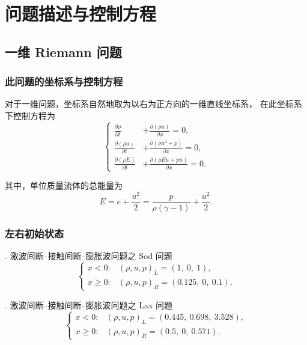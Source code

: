 \section{问题描述与控制方程}

\subsection{一维 Riemann 问题}

\subsubsection{此问题的坐标系与控制方程}
    对于一维问题，坐标系自然地取为以右为正方向的一维直线坐标系，
    在此坐标系下控制方程为
\begin{equation}
\left\{
\begin{aligned}
\frac{\partial \rho}{\partial t}
&+
\frac{\partial (\rho u)}{\partial x}
=0,\\[6pt]
\frac{\partial (\rho u)}{\partial t}
&+
\frac{\partial (\rho u^2+p)}{\partial x}
=0,\\[6pt]
\frac{\partial (\rho E)}{\partial t}
&+
\frac{\partial (\rho E u+p u)}{\partial x}
=0.
\end{aligned}
\right.
\end{equation}

其中，单位质量流体的总能量为
\begin{equation}
E=e+\frac{u^2}{2}
=
\frac{p}{\rho(\gamma-1)}
+
\frac{u^2}{2}.
\end{equation}

\subsubsection{左右初始状态}

. 激波间断--接触间断--膨胀波问题之 Sod 问题
\begin{equation}
\begin{cases}
x<0: & (\rho,u,p)_L=(1,\ 0,\ 1),\\
x\geq 0: & (\rho,u,p)_R=(0.125,\ 0,\ 0.1).
\end{cases}
\end{equation}

. 激波间断--接触间断--膨胀波问题之 Lax 问题
\begin{equation}
\begin{cases}
x<0: & (\rho,u,p)_L=(0.445,\ 0.698,\ 3.528),\\
x\geq 0: & (\rho,u,p)_R=(0.5,\ 0,\ 0.571).
\end{cases}
\end{equation}

